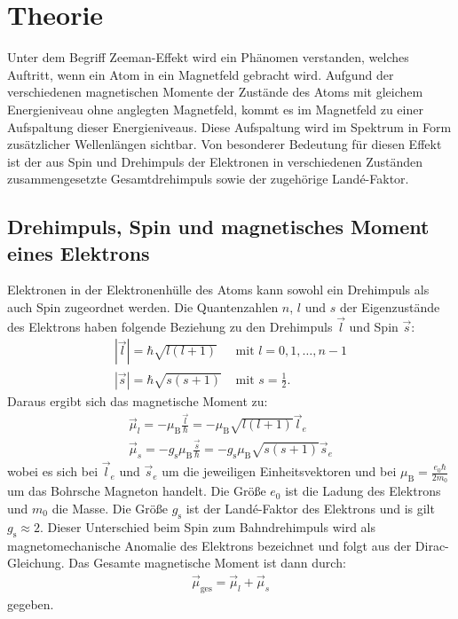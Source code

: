 
\section{Theorie}
\label{sec:Theorie}

Unter dem Begriff Zeeman-Effekt wird ein Phänomen verstanden, welches Auftritt, wenn ein Atom in ein Magnetfeld gebracht wird. Aufgund der verschiedenen magnetischen Momente der Zustände des Atoms mit gleichem Energieniveau ohne anglegten Magnetfeld, kommt es im Magnetfeld zu einer Aufspaltung dieser Energieniveaus. Diese Aufspaltung wird im Spektrum in Form zusätzlicher Wellenlängen sichtbar. Von besonderer Bedeutung für diesen Effekt ist der aus Spin und Drehimpuls der Elektronen in verschiedenen Zuständen zusammengesetzte Gesamtdrehimpuls sowie der zugehörige Landé-Faktor.


\subsection{Drehimpuls, Spin und magnetisches Moment eines Elektrons}
Elektronen in der Elektronenhülle des Atoms kann sowohl ein Drehimpuls als auch Spin zugeordnet werden. Die Quantenzahlen $n$, $l$ und $s$ der Eigenzustände des Elektrons haben folgende Beziehung zu den Drehimpuls $\vec{l}$ und Spin $\vec{s}$:
\begin{align*}
	|\vec{l}|= \hbar \sqrt{l(l+1)} & \text{ mit } l=0, 1, \hdots, n-1\\
	|\vec{s}|= \hbar \sqrt{s(s+1)} & \text{ mit } s=\frac{1}{2}.
\end{align*}
Daraus ergibt sich das magnetische Moment zu:
\begin{gather*}
	\vec{\mu}_l=-\mu_\text{B} \frac{\vec{l}}{\hbar}=-\mu_\text{B} \sqrt{l(l+1)} \vec{l}_e \\
	\vec{\mu}_s=- g_\text{s} \mu_\text{B} \frac{\vec{s}}{\hbar}=- g_\text{s} \mu_\text{B} \sqrt{s(s+1)} \vec{s}_e
\end{gather*}
wobei es sich bei $\vec{l}_e$ und $\vec{s}_e$ um die jeweiligen Einheitsvektoren und bei $\mu_\text{B}=\frac{e_0 \hbar}{2 m_0}$ um das Bohrsche Magneton handelt. Die Größe $e_0$ ist die Ladung des Elektrons und $m_0$ die Masse. Die Größe $g_\text{s}$ ist der Landé-Faktor des Elektrons und is gilt $g_\text{s} \approx 2$. Dieser Unterschied beim Spin zum Bahndrehimpuls wird als magnetomechanische Anomalie des Elektrons bezeichnet und folgt aus der Dirac-Gleichung. Das Gesamte magnetische Moment ist dann durch:
\begin{gather*}
	\vec{\mu}_\text{ges}= \vec{\mu}_l+\vec{\mu}_s
\end{gather*}
gegeben.

